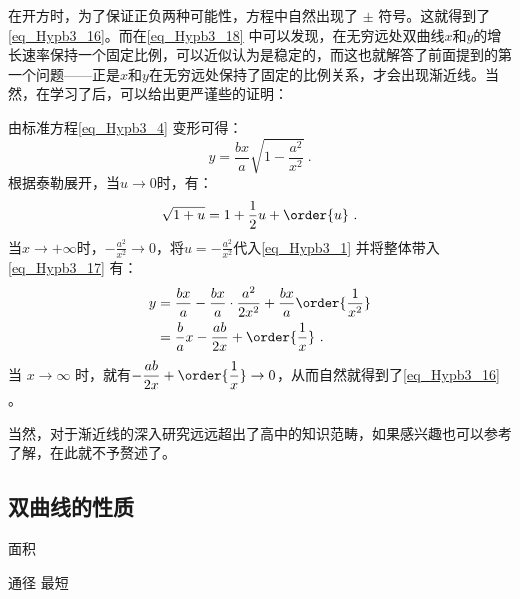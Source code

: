 在开方时，为了保证正负两种可能性，方程中自然出现了 $\pm$ 符号。这就得到了\autoref{eq_Hypb3_16}。而在\autoref{eq_Hypb3_18} 中可以发现，在无穷远处双曲线$x$和$y$的增长速率保持一个固定比例，可以近似认为是稳定的，而这也就解答了前面提到的第一个问题——正是$x$和$y$在无穷远处保持了固定的比例关系，才会出现渐近线。当然，在学习了后，可以给出更严谨些的证明：

由标准方程\autoref{eq_Hypb3_4} 变形可得：
\begin{equation}\label{eq_Hypb3_17}
y = \frac{bx}{a} \sqrt{1-\frac{a^2}{x^2}}~.
\end{equation}
根据泰勒展开，当$u\to 0$时，有：
\begin{equation}\label{eq_Hypb3_1}
\sqrt{1+u} = 1+\frac{1}{2}u+\order{u}~.
\end{equation}
当$x\to+\infty$时，$-\displaystyle\frac{a^2}{x^2}\to0$，将$\displaystyle u=-\frac{a^2}{x^2}$代入\autoref{eq_Hypb3_1} 并将整体带入\autoref{eq_Hypb3_17} 有：
\begin{equation}\label{eq_Hypb3_13}
\begin{split}
y &= \frac{bx}{a} -\frac{bx}{a} \cdot\frac{a^2}{2x^2}+\frac{bx}{a}\order{\frac{1}{x^2}}\\
& = \frac ba x - \frac{ab}{2x} + \order{\frac{1}{x}}~.
\end{split}
\end{equation}
当 $x\to\infty$ 时，就有$\displaystyle- \frac{ab}{2x} + \order{\frac{1}{x}}\to0$，从而自然就得到了\autoref{eq_Hypb3_16} 。

当然，对于渐近线的深入研究远远超出了高中的知识范畴，如果感兴趣也可以参考了解，在此就不予赘述了。

\subsection{双曲线的性质}
面积

通径
最短
